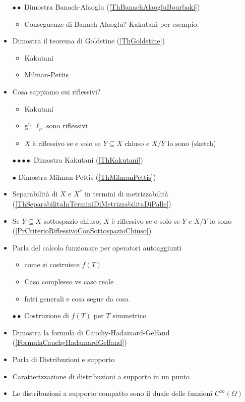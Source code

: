\documentclass[a4paper]{report}
\begin{document}
\begin{itemize}
\item[$\bullet\bullet$] Dimostra Banach-Alaoglu (\ref{ThBanachAlaogluBourbaki})
\begin{itemize}
    \item Conseguenze di Banach-Alaoglu? Kakutani per esempio.
\end{itemize}
\item Dimostra il teorema di Goldstine (\ref{ThGoldstine})
\begin{itemize}
    \item Kakutani
    \item Milman-Pettis
\end{itemize}
\item Cosa sappiamo sui riflessivi?
\begin{itemize}
    \item Kakutani
    \item gli $\ell_p$ sono riflessivi
    \item $X$ \`e riflessivo se e solo se $Y\subseteq X$ chiuso e $X/Y$ lo sono (sketch)
\end{itemize}
\item[$\bullet\bullet\bullet\bullet$] Dimostra Kakutani (\ref{ThKakutani})
\item[$\bullet$] Dimostra Milman-Pettis (\ref{ThMilmanPettis})
\item Separabilit\`a di $X$ e $X^\ast$ in termini di metrizzabilit\`a (\ref{ThSeparabilitaInTerminiDiMetrizzabilitaDiPalle})
\item Se $Y\subseteq X$ sottospazio chiuso, $X$ \`e riflessivo se e solo se $Y$ e $X/Y$ lo sono (\ref{PrCriterioRiflessivoConSottospazioChiuso})
\item Parla del calcolo funzionare per operatori autoaggiunti
\begin{itemize}
    \item come si costruisce $f(T)$
    \item Caso complesso vs caso reale
    \item fatti generali e cosa segue da cosa
\end{itemize}
\item[$\bullet\bullet$] Costruzione di $f(T)$ per $T$ simmetrico
\item Dimostra la formula di Cauchy-Hadamard-Gelfand (\ref{FormulaCauchyHadamardGelfand})
\item Parla di Distribuzioni e supporto
\item Caratterizzazione di distribuzioni a supporto in un punto
\item Le distribuzioni a supporto compatto sono il duale delle funzioni $C^\infty(\Omega)$ 

\end{itemize}
\end{document}
